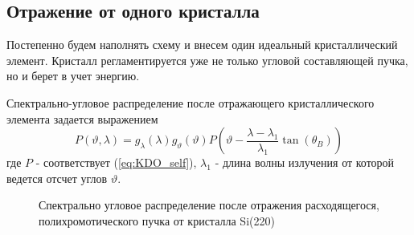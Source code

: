 \subsection{Отражение от одного кристалла}
\label{sec:single_crystal_section}
  Постепенно будем наполнять схему и внесем один идеальный кристаллический элемент.
  Кристалл регламентируется уже не только угловой составляющей пучка, но и берет в учет энергию.

  Спектрально-угловое распределение после отражающего кристаллического элемента задается выражением
  \begin{equation} \label{eq:monochromator_spectra}
    P(\vartheta,\lambda) = g_{\lambda}(\lambda)g_{\vartheta}(\vartheta) P(\vartheta - \frac{\lambda - \lambda_1}{\lambda_1}\tan(\theta_B))
   \end{equation}
где $P$ - соответствует (\ref{eq:KDO_self}), $\lambda_1$ - длина волны излучения от которой ведется отсчет углов $\vartheta$.
\begin{figure}[H]
  \centering
  \hfill

  \caption{Спектрально угловое распределение после отражения расходящегося, полихромотического пучка от кристалла Si(220)}
  \label{ris:single_crystal_schem_lamtet}
\end{figure}

